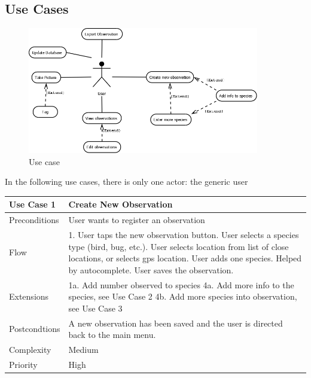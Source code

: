 \subsection{Use Cases}
\begin{figure}[htb]
	\centering
	\includegraphics[width=0.9\textwidth]{reqspec/UseCase.png}
	\caption{Use case}
	\label{fig:usecase}
\end{figure}

In the following use cases, there is only one actor: the generic user

\begin{tabular}[t]{|l|p{}|}\hline
	Use Case 1&Create New Observation\\\hline
	Preconditions&User wants to register an observation\\\hline
	Flow&1. User taps the new observation button\newline
	2. User selects a species type (bird, bug, etc.)\newline
	3. User selects location from list of close locations, or selects gps location\newline
	4. User adds one species. Helped by autocomplete\newline
	5. User saves the observation.\\\hline
	Extensions& 1a. Add number observed to species\newline
	4a. Add more info to the species, see Use Case 2\newline
	4b. Add more species into observation, see Use Case 3\\\hline
	Postcondtions&A new observation has been saved and the user is directed back to the main menu.\\\hline
	Complexity&Medium\\\hline
	Priority&High\\\hline
\end{tabular}

